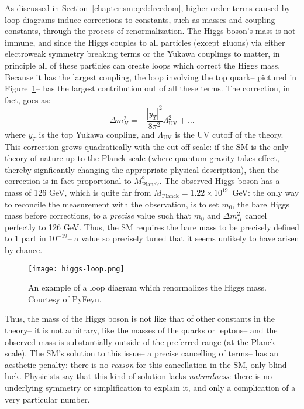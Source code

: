 As discussed in Section~\ref{chapter:sm:qcd:freedom}, higher-order terms caused by loop diagrams induce corrections to constants, such as masses and coupling constants, through the process of renormalization. The Higgs boson's mass is not immune, and since the Higgs couples to all particles (except gluons) via either electroweak symmetry breaking terms or the Yukawa couplings to matter, in principle all of these particles can create loops which correct the Higgs mass. Because it has the largest coupling, the loop involving the top quark-- pictured in Figure~\ref{fig:susy:higgs-loop}--  has the largest contribution out of all these terms.  The correction, in fact, goes as:
%
\begin{equation}
\Delta m_H^2 = - \frac{|y_T|^2}{8\pi^2}\Lambda_\mathrm{UV}^2 + \ldots
\end{equation}
%
where $y_T$ is the top Yukawa coupling, and $\Lambda_\mathrm{UV}$ is the UV cutoff of the theory. This correction grows quadratically with the cut-off scale: if the SM is the only theory of nature up to the Planck scale (where quantum gravity takes effect, thereby signficantly changing the appropriate physical description), then the correction is in fact proportional to $M_\mathrm{Planck}^2$. The observed Higgs boson has a mass of 126 GeV, which is quite far from $M_\mathrm{Planck} = 1.22\times 10^{19}$~GeV: the only way to reconcile the measurement with the observation, is to set $m_0$, the bare Higgs mass before corrections, to a \textit{precise} value such that $m_0$ and $\Delta m_H^2$ cancel perfectly to 126 GeV. Thus, the SM requires the bare mass to be precisely defined to 1 part in $10^{-19}$-- a value so precisely tuned that it seems unlikely to have arisen by chance. 


\begin{figure}
\centering
\texttt{[image: higgs-loop.png]}
\label{fig:susy:higgs-loop}
\caption{An example of a loop diagram which renormalizes the Higgs mass. Courtesy of PyFeyn.}
\end{figure}


Thus, the mass of the Higgs boson is not like that of other constants in the theory-- it is not arbitrary, like the masses of the quarks or leptons-- and the observed mass is substantially outside of the preferred range (at the Planck scale).  The SM's solution to this issue-- a precise cancelling of terms-- has an aesthetic penalty: there is no \textit{reason} for this cancellation in the SM, only blind luck. Physicists say that this kind of solution lacks \textit{naturalness}: there is no underlying symmetry or simplification to explain it, and only a complication of a very particular number.



